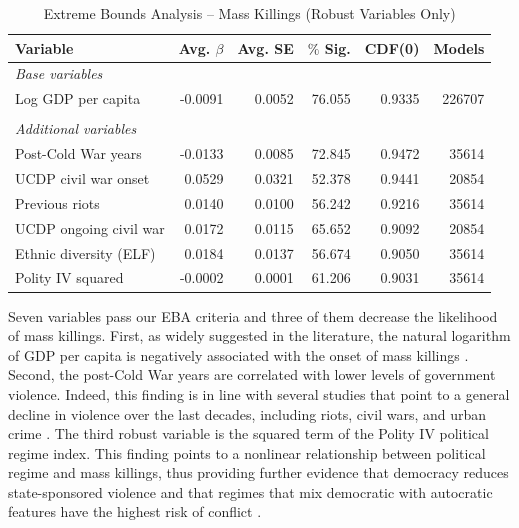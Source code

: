 \documentclass[a4paper,12pt]{article}
\begin{document}
\begin{table}[H]
\centering
\begin{tabular}{lrrrrr}
\hline
\textbf{Variable} & \textbf{Avg. $\beta$} & \textbf{Avg. SE} & \textbf{$\%$ Sig.} & \textbf{CDF(0)} & \textbf{Models} \\ \hline
\textit{Base variables} &  &  &  &  &  \\
Log GDP per capita & -0.0091 & 0.0052 & 76.055 & 0.9335 & 226707 \\
 &  &  &  &  &  \\
\textit{Additional variables} &  &  &  &  &  \\
Post-Cold War years & -0.0133 & 0.0085 & 72.845 & 0.9472 & 35614 \\
UCDP civil war onset & 0.0529 & 0.0321 & 52.378 & 0.9441 & 20854 \\
Previous riots & 0.0140 & 0.0100 & 56.242 & 0.9216 & 35614 \\
UCDP ongoing civil war & 0.0172 & 0.0115 & 65.652 & 0.9092 & 20854 \\
Ethnic diversity (ELF) & 0.0184 & 0.0137 & 56.674 & 0.9050 & 35614 \\
Polity IV squared & -0.0002 & 0.0001 & 61.206 & 0.9031 & 35614 \\ \hline
\end{tabular}
\caption{Extreme Bounds Analysis -- Mass Killings (Robust Variables Only)}
\label{tab:eba01}
\end{table}
	
Seven variables pass our EBA criteria and three of them decrease the likelihood of mass killings. First, as widely suggested in the literature, the natural logarithm of GDP per capita is negatively associated with the onset of mass killings \citep[e.g.,][]{besanccon2005relative, easterly2006development,esteban2015strategic}. Second, the post-Cold War years are correlated with lower levels of government violence. Indeed, this finding is in line with several studies that point to a general decline in violence over the last decades, including riots, civil wars, and urban crime \citep{pinker2011better,straus2012wars,valentino2014we}. The third robust variable is the squared term of the Polity IV political regime index. This finding points to a nonlinear relationship between political regime and mass killings, thus providing further evidence that democracy reduces state-sponsored violence \citep{rost2013will,rummel1995democracy} and that regimes that mix democratic with autocratic features have the highest risk of conflict \citep{hegre2001toward,muchlinski2014grievances}.
	
\end{document}
